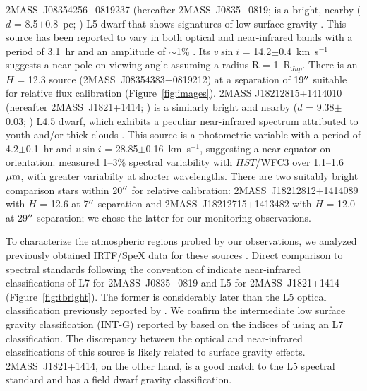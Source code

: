 \documentclass[twocolumn]{aastex6}
\newcommand{\kms}{km~s$^{-1}$}
\newcommand{\rjup}{R$_{Jup}$}
\newcommand{\sha}{2MASS~J0835$-$0819}
\newcommand{\shb}{2MASS~J1821+1414}
\begin{document}
2MASS~J08354256$-$0819237 (hereafter {\sha}; \citealt{2003AJ....126.2421C} is a bright, nearby ($d$ = 8.5$\pm$0.8~pc; \citealt{2012ApJ...752...56F}) L5 dwarf that shows signatures of low surface gravity \citep{2016ApJ...833...96L}. 
This source has been reported to vary in both optical and near-infrared bands with a period of 3.1~hr and an amplitude of $\sim$1\%  \citep{2004MNRAS.354..378K,2014A&A...566A.111W}.
Its $v\sin{i}$ = 14.2$\pm$0.4~{\kms} \citep{2010ApJ...723..684B} suggests a near pole-on viewing angle assuming a radius R = 1~{\rjup}.
There is an $H$ = 12.3 source (2MASS~J08354383$-$0819212) at a separation of 19$\mbox{$^{\prime\prime}$}$ suitable for relative flux calibration (Figure~\ref{fig:images}). 
2MASS J18212815+1414010 (hereafter {\shb}; \citealt{2008ApJ...686..528L}) is a similarly bright and nearby ($d$ = 9.38$\pm$0.03; \citealt{2016MNRAS.455..357S}) L4.5 dwarf, which exhibits a peculiar near-infrared spectrum attributed to youth and/or thick clouds \citep{2008ApJ...686..528L,2015ApJS..219...33G,2016ApJ...833...96L}.
This source is a photometric variable with a period of 4.2$\pm$0.1~hr \citep{2015ApJ...799..154M} and $v\sin{i}$ = 28.85$\pm$0.16~{\kms}, suggesting a near equator-on orientation.  \citet{2015ApJ...798L..13Y} measured 1--3\% spectral variability with $HST$/WFC3 over 1.1--1.6~$\mbox{$\mu$m}$, with greater variabilty at shorter wavelengths.
There are two suitably bright comparison stars within 20$\mbox{$^{\prime\prime}$}$ for relative calibration: 2MASS~J18212812+1414089 with $H$ = 12.6 at 7$\mbox{$^{\prime\prime}$}$ separation and 2MASS~J18212715+1413482 with $H$ = 12.0 at 29$\mbox{$^{\prime\prime}$}$ separation; we chose the latter for our monitoring observations.



To characterize the atmospheric regions probed by our observations, we analyzed previously 
obtained IRTF/SpeX data for these sources \citep{2008ApJ...686..528L,2010ApJ...710.1142B}.
Direct comparison to spectral standards following the convention of \citet{2010ApJS..190..100K} indicate near-infrared
classifications of L7 for {\sha} and L5 for {\shb} (Figure~\ref{fig:tbright}). The former is considerably later than the L5 optical classification previously reported by \citet{2003AJ....126.2421C}. We confirm the intermediate low surface gravity classification (INT-G) reported by \citet{2016ApJ...833...96L} based on the indices of \citet{2013ApJ...772...79A} using an L7 classification. The discrepancy between the optical and near-infrared classifications of this source is likely related to surface gravity effects. {\shb}, on the other hand, is a good match to the L5 spectral standard and has a field dwarf gravity classification.
\end{document}
